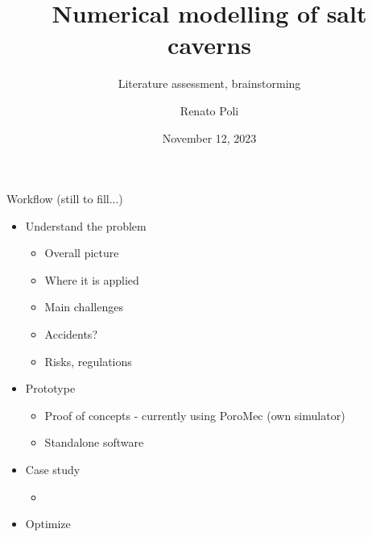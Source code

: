 

\usepackage{graphicx}
\graphicspath{ {./png/} }


\title[Num modelling of salt caverns]{Numerical modelling of salt caverns}
\subtitle{Literature assessment, brainstorming}
\author[RPoli]{Renato Poli}
\date{November 12, 2023}



\maketitle

\begin{frame}{Workflow (still to fill...)}
\begin{itemize}
\item Understand the problem
	\begin{itemize}
		\item Overall picture
		\item Where it is applied
		\item Main challenges
		\item Accidents?
		\item Risks, regulations
    \end{itemize}
\item Prototype
	\begin{itemize}
		\item Proof of concepts - currently using PoroMec (own simulator)
		\item Standalone software
	\end{itemize}
\item Case study
	\begin{itemize}
		\item 
	\end{itemize}
\item Optimize
\end{itemize}
\end{frame}

